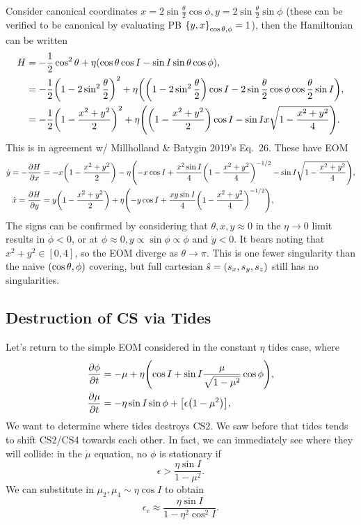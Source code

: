 \documentclass[11pt,
        usenames, %
        dvipsnames %
    ]{article}
\newcommand*{\pd}[2]{\frac{\partial#1}{\partial#2}}
\DeclarePairedDelimiter\p{\lparen}{\rparen}
\DeclarePairedDelimiter\s{\lbrack}{\rbrack}
\DeclarePairedDelimiter\z{\lbrace}{\rbrace}
\begin{document}
Consider canonical coordinates $x = 2\sin \frac{\theta}{2}\cos \phi, y = 2\sin
\frac{\theta}{2}\sin \phi$ (these can be verified to be canonical by evaluating
PB $\z*{y, x}_{\cos \theta, \phi} = 1$), then the Hamiltonian can be written
\begin{align}
    H &= -\frac{1}{2}\cos^2\theta
        + \eta \p*{\cos \theta \cos I - \sin I \sin \theta \cos \phi}
        ,\nonumber\\
        &= -\frac{1}{2}\p*{1 - 2\sin^2\frac{\theta}{2}}^2
            + \eta\p*{\p*{1 - 2\sin^2\frac{\theta}{2}}\cos I
            - 2 \sin \frac{\theta}{2}\cos \phi \cos \frac{\theta}{2}\sin I}
            ,\nonumber\\
        &= -\frac{1}{2}\p*{1 - \frac{x^2 + y^2}{2}}^2
            + \eta\p*{\p*{1 - \frac{x^2 + y^2}{2}}\cos I
                - \sin I x\sqrt{1 - \frac{x^2 + y^2}{4}}}.
\end{align}
This is in agreement w/ Millholland \& Batygin 2019's Eq.~26. These have EOM
\begin{align*}
    \dot{y} = -\pd{H}{x} &=
        -x\p*{1 - \frac{x^2 + y^2}{2}} - \eta\p*{
            -x \cos I + \frac{x^2\sin I}{4}\p*{1 - \frac{x^2 + y^2}{4}}^{-1/2}
            - \sin I \sqrt{1 - \frac{x^2 + y^2}{4}}},\\
    \dot{x} = \pd{H}{y} &=
        y\p*{1 - \frac{x^2 + y^2}{2}} + \eta\p*{
            -y \cos I + \frac{xy\sin I}{4}\p*{1 - \frac{x^2 + y^2}{4}}^{-1/2}
            },\\
\end{align*}
The signs can be confirmed by considering that $\theta, x, y \approx 0$ in the
$\eta \to 0$ limit results in $\dot{\phi} < 0$, or at $\phi \approx 0, y \propto
\sin \phi \propto \phi$ and $\dot{y} < 0$. It bears noting that $x^2 + y^2 \in
[0, 4]$, so the EOM diverge as $\theta \to \pi$. This is one fewer singularity
than the naive $\p*{\cos\theta, \phi}$ covering, but full cartesian $\hat{s} =
\p*{s_x, s_y, s_z}$ still has no singularities.

\subsection{Destruction of CS via Tides}

Let's return to the simple EOM considered in the constant $\eta$ tides case,
where
\begin{align}
    \pd{\phi}{t} &= -\mu + \eta\p*{\cos I + \sin I \frac{\mu}{\sqrt{1 - \mu^2}}
        \cos \phi} ,\\
    \pd{\mu}{t} &= -\eta \sin I \sin \phi + \s*{\epsilon \p*{1 - \mu^2}},
\end{align}
We want to determine where tides destroys CS2. We saw before that tides tends to
shift CS2/CS4 towards each other. In fact, we can immediately see where they
will collide: in the $\dot{\mu}$ equation, no $\phi$ is stationary if
\begin{equation}
    \epsilon > \frac{\eta \sin I}{1 - \mu^2}.
\end{equation}
We can substitute in $\mu_2, \mu_4 \sim \eta \cos I$ to obtain
\begin{equation}
    \epsilon_{c} \approx \frac{\eta \sin I}{1 - \eta^2\cos^2 I}.
\end{equation}
\end{document}
